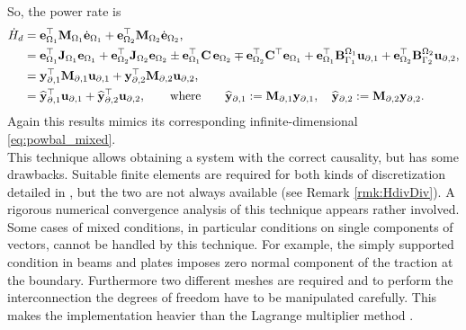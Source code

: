 So, the power rate is 
\begin{equation}
\begin{aligned}
\dot{H}_d &= {\mathbf{e}}_{\Omega_1}^\top \mathbf{M}_{\Omega_1}
\dot{\mathbf{e}}_{\Omega_1} + {\mathbf{e}}_{\Omega_2}^\top \mathbf{M}_{\Omega_2}
\dot{\mathbf{e}}_{\Omega_2}, \\
&= {\mathbf{e}}_{\Omega_1}^\top \mathbf{J}_{\Omega_1} {\mathbf{e}}_{\Omega_1} + {\mathbf{e}}_{\Omega_2}^\top \mathbf{J}_{\Omega_2} {\mathbf{e}}_{\Omega_2} \pm {\mathbf{e}}_{\Omega_1}^\top \mathbf{C} \, {\mathbf{e}}_{\Omega_2} \mp {\mathbf{e}}_{\Omega_2}^\top \mathbf{C}^\top {\mathbf{e}}_{\Omega_1} +  {\mathbf{e}}_{\Omega_1}^\top \mathbf{B}_{\Gamma_1}^{\Omega_1} {\mathbf{u}_{\partial, 1}} + {\mathbf{e}}_{\Omega_2}^\top \mathbf{B}_{\Gamma_2}^{\Omega_2} {\mathbf{u}_{\partial, 2}}, \\
&= \mathbf{y}_{\partial, 1}^\top \mathbf{M}_{\partial, 1} \mathbf{u}_{\partial, 1} + \mathbf{y}_{\partial, 2}^\top \mathbf{M}_{\partial, 2} \mathbf{u}_{\partial, 2}, \\
&= \widehat{\mathbf{y}}_{\partial, 1}^\top \mathbf{u}_{\partial, 1} + \widehat{\mathbf{y}}_{\partial, 2}^\top \mathbf{u}_{\partial, 2}, \qquad \text{where} \qquad \widehat{\mathbf{y}}_{\partial, 1} :=\mathbf{M}_{\partial, 1} \mathbf{y}_{\partial, 1}, \quad \widehat{\mathbf{y}}_{\partial, 2} :=\mathbf{M}_{\partial, 2} \mathbf{y}_{\partial, 2}.
\end{aligned}
\end{equation}
Again this results mimics its corresponding infinite-dimensional \eqref{eq:powbal_mixed}. \\


This technique allows obtaining a system with the correct causality, but has some drawbacks.  
Suitable finite elements are required for both kinds of discretization detailed in , but the two are not always available (see Remark \ref{rmk:HdivDiv}). A rigorous numerical convergence analysis of this technique appears rather involved.  Some cases of mixed conditions, in particular conditions on single components of vectors, cannot be handled by this technique. For example, the simply supported condition in beams and plates imposes zero normal component of the traction at the boundary. Furthermore two different meshes are required and to perform the interconnection the degrees of freedom have to be manipulated carefully. This makes the implementation heavier than the Lagrange multiplier method .


